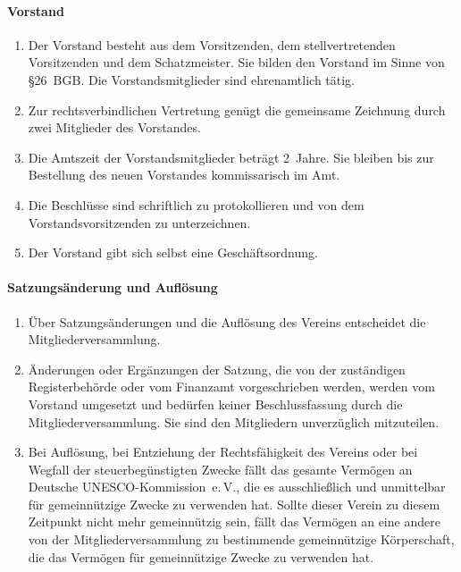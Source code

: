 \documentclass[12pt]{satzung}
\begin{document}
\paragraph{Vorstand}
\label{sec:vorstand}

\begin{enumerate}[(1)]
    \item Der Vorstand besteht aus dem Vorsitzenden, dem stellvertretenden Vorsitzenden und dem Schatzmeister. Sie bilden den Vorstand im Sinne von §26~BGB. Die Vorstandsmitglieder sind ehrenamtlich tätig.
    \item Zur rechtsverbindlichen Vertretung genügt die gemeinsame Zeichnung durch zwei Mitglieder des Vorstandes.
    \item Die Amtszeit der Vorstandsmitglieder beträgt 2~Jahre. Sie bleiben bis zur Bestellung des neuen Vorstandes kommissarisch im Amt.
    \item Die Beschlüsse sind schriftlich zu protokollieren und von dem Vorstandsvorsitzenden zu unterzeichnen.
    \item Der Vorstand gibt sich selbst eine Geschäftsordnung. 

\end{enumerate}

\paragraph{Satzungsänderung und Auflösung}
\label{sec:satzunsgaenderung-aufloesung}

\begin{enumerate}[(1)]
    \item Über Satzungsänderungen und die Auflösung des Vereins entscheidet die Mitgliederversammlung.
    \item Änderungen oder Ergänzungen der Satzung, die von der zuständigen Registerbehörde oder vom Finanzamt vorgeschrieben werden, werden vom Vorstand umgesetzt und bedürfen keiner Beschlussfassung durch die Mitgliederversammlung. Sie sind den Mitgliedern unverzüglich mitzuteilen.
    \item Bei Auflösung, bei Entziehung der Rechtsfähigkeit des Vereins oder bei Wegfall der steuerbegünstigten Zwecke fällt das gesamte Vermögen an Deutsche UNESCO-Kommission~e.\,V., die es ausschließlich und unmittelbar für gemeinnützige Zwecke zu verwenden hat. Sollte dieser Verein zu diesem Zeitpunkt nicht mehr gemeinnützig sein, fällt das Vermögen an eine andere von der Mitgliederversammlung zu bestimmende gemeinnützige Körperschaft, die das Vermögen für gemeinnützige Zwecke zu verwenden hat. 
\end{enumerate}
\end{document}
